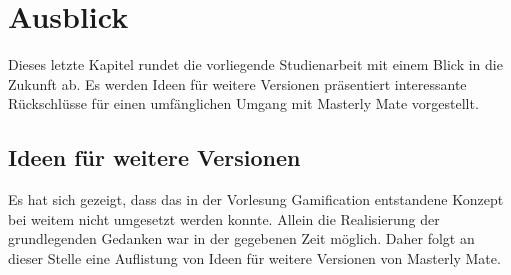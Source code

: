 \chapter{Ausblick}\label{ref:chaptSummary}
Dieses letzte Kapitel rundet die vorliegende Studienarbeit mit einem Blick in
die Zukunft ab. Es werden Ideen für weitere Versionen präsentiert interessante
Rückschlüsse für einen umfänglichen Umgang mit Masterly Mate vorgestellt.

\section{Ideen für weitere Versionen}\label{ref:weitereIdeen}
Es hat sich gezeigt, dass das in der Vorlesung Gamification entstandene Konzept
bei weitem nicht umgesetzt werden konnte. Allein die Realisierung der
grundlegenden Gedanken war in der gegebenen Zeit möglich. Daher folgt an dieser
Stelle eine Auflistung von Ideen für weitere Versionen von Masterly Mate.


